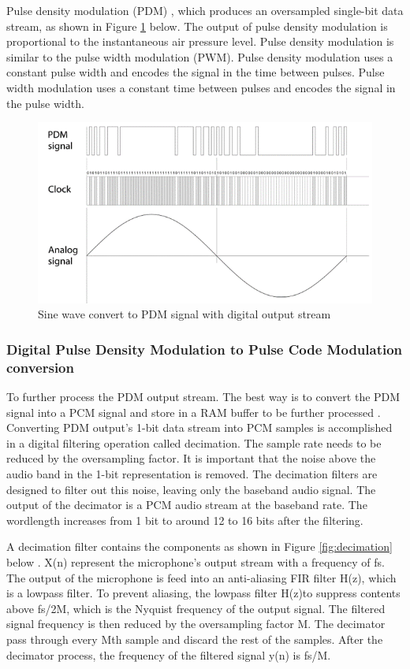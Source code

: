 Pulse density modulation (PDM) \cite{PDM}, which produces an oversampled single-bit data stream, as shown in Figure \ref{fig:PDM} below. The output of pulse density modulation is proportional to the instantaneous air pressure level. Pulse density modulation is similar to the pulse width modulation (PWM). Pulse density modulation uses a constant pulse width and encodes the signal in the time between pulses. Pulse width modulation uses a constant time between pulses and encodes the signal in the pulse width. 
\begin{figure}[H]
	\centering
	\noindent\includegraphics[width=1\textwidth]{images/PDM.png}
	\caption{Sine wave convert to PDM signal with digital output stream}
	\label{fig:PDM}
\end{figure}

\subsubsection{Digital Pulse Density Modulation to Pulse Code Modulation conversion}
To further process the PDM output stream. The best way is to convert the PDM signal into a PCM signal and store in a RAM buffer to be further processed \cite{PDM}. Converting PDM output's 1-bit data stream into PCM samples is accomplished in a digital filtering operation called decimation. The sample rate needs to be reduced by the oversampling factor. It is important that the noise above the audio band in the 1-bit representation is removed. The decimation filters are designed to filter out this noise, leaving only the baseband audio signal. The output of the decimator is a PCM audio stream at the baseband rate. The wordlength increases from 1 bit to around 12 to 16 bits after the filtering.

A decimation filter contains the components as shown in Figure \ref{fig:decimation} below \cite{Decimation}. X(n) represent the microphone's output stream with a frequency of fs. The output of the microphone is feed into an anti-aliasing FIR filter H(z), which is a lowpass filter. To prevent aliasing, the lowpass filter H(z)to suppress contents above fs/2M, which is the Nyquist frequency of the output signal. The filtered signal frequency is then reduced by the oversampling factor M. The decimator pass through every Mth sample and discard the rest of the samples. After the decimator process, the frequency of the filtered signal y(n) is fs/M. 

